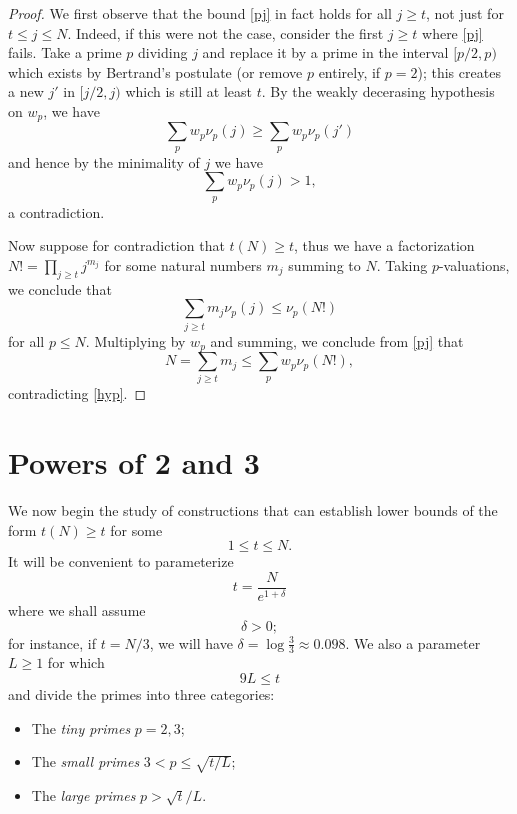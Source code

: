 \documentclass[12pt,a4paper,reqno]{amsart}
\numberwithin{equation}{section}
\theoremstyle{plain}
\theoremstyle{definition}
\begin{document}
\begin{proof}
We first observe that the bound \eqref{pj} in fact holds for all $j \geq t$, not just for $t \leq j \leq N$.  Indeed, if this were not the case, consider the first $j \geq t$ where \eqref{pj} fails.  Take a prime $p$ dividing $j$ and replace it by a prime in the interval $[p/2,p)$ which exists by Bertrand's postulate (or remove $p$ entirely, if $p=2$); this creates a new $j'$ in $[j/2,j)$ which is still at least $t$.  By the weakly decerasing hypothesis on $w_p$, we have
$$ \sum_p w_p \nu_p(j) \geq \sum_p w_p \nu_p(j')$$
and hence by the minimality of $j$ we have
$$ \sum_p w_p \nu_p(j) > 1, $$
a contradiction.

Now suppose for contradiction that $t(N) \geq t$, thus we have a factorization $N! = \prod_{j \geq t} j^{m_j}$ for some natural numbers $m_j$ summing to $N$.  Taking $p$-valuations, we conclude that
$$ \sum_{j \geq t} m_j \nu_p(j) \leq \nu_p(N!)$$
for all $p \leq N$.  Multiplying by $w_p$ and summing, we conclude from \eqref{pj} that
$$ N = \sum_{j \geq t} m_j \leq \sum_p w_p \nu_p(N!),$$
contradicting \eqref{hyp}.
\end{proof}


\section{Powers of 2 and 3}

We now begin the study of constructions that can establish lower bounds of the form $t(N) \geq t$ for some 
\begin{equation}\label{tn}
  1 \leq t \leq N.  
\end{equation}
It will be convenient to parameterize
\begin{equation}\label{tparam}
  t = \frac{N}{e^{1+\delta}}
\end{equation}
where we shall assume
\begin{equation}\label{delta-pos}
\delta > 0;
\end{equation}
for instance, if $t=N/3$, we will have $\delta = \log \frac{3}{3} \approx 0.098$.  We also a parameter $L \geq 1$ for which
\begin{equation}\label{tl}
  9L \leq t
\end{equation}
and divide the primes into three categories:
\begin{itemize}
\item The \emph{tiny primes} $p=2,3$;
\item The \emph{small primes} $3 < p \leq \sqrt{t/L}$;
\item The \emph{large primes} $p > \sqrt{t}/L$.
\end{itemize}
\end{document}
